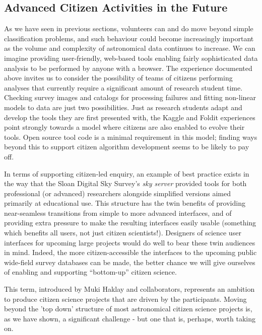 \documentclass{ar2e}
\begin{document}
\subsection{Advanced Citizen Activities in the Future}

As we have seen in previous sections, volunteers can and do move beyond simple
classification problems, and such behaviour could become increasingly important
as the volume and complexity of astronomical data continues to increase.  We can
imagine providing user-friendly, web-based tools enabling  fairly sophisticated
data analysis to be performed by anyone with a browser. The experience
documented above invites us to consider the possibility of teams of citizens 
performing analyses that currently require a significant amount of research
student time.  Checking survey images and catalogs  for processing failures and
fitting non-linear models to data are just two possibilities. Just as research
students adapt and develop the tools they are first presented with, the Kaggle
and Foldit experiences point strongly towards a model where citizens are also
enabled to evolve their tools. Open source tool code is a minimal requirement in
this model; finding ways beyond this to support citizen algorithm development
seems to be likely to pay off.

In terms of supporting citizen-led enquiry, an example of best practice exists
in the way that the Sloan Digital Sky Survey's \textit{sky server} provided tools
for both professional (or advanced) researchers alongside simplified versions
aimed primarily at educational use. This structure has the twin benefits of
providing near-seamless transitions from simple to more advanced interfaces, and
of providing extra pressure to make the resulting interfaces easily usable 
(something which benefits all users, not just citizen scientists!). Designers of
science user interfaces for upcoming large projects would do well to bear these
twin audiences in mind. Indeed, the more citizen-accessible the interfaces to
the upcoming public wide-field survey databases can be made, the better chance
we will give ourselves of enabling and supporting ``bottom-up'' citizen
science.  

This term, introduced by Muki Haklay and collaborators, represents an ambition to produce
citizen science projects that are driven by the participants. Moving beyond the 'top down'
structure of most astronomical citizen science projects is, as we have shown, a significant
challenge - but one that is, perhaps, worth taking on. 
\end{document}
